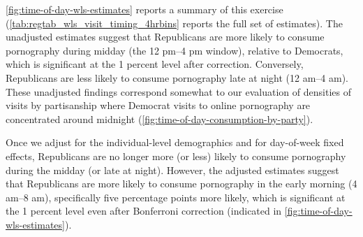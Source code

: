 \documentclass[12pt,twoside]{article}
\begin{document}
\cref{fig:time-of-day-wls-estimates} reports a summary of this exercise (\cref{tab:regtab_wls_visit_timing_4hrbins} reports the full set of estimates). The unadjusted estimates suggest that Republicans are more likely to consume pornography during midday (the 12 pm--4 pm window), relative to Democrats, which is significant at the 1 percent level after correction. Conversely, Republicans are less likely to consume pornography late at night (12 am--4 am). These unadjusted findings correspond somewhat to our evaluation of densities of visits by partisanship where Democrat visits to online pornography are concentrated around midnight (\cref{fig:time-of-day-consumption-by-party}).

Once we adjust for the individual-level demographics and for day-of-week fixed effects, Republicans are no longer more (or less) likely to consume pornography during the midday (or late at night). However, the adjusted estimates suggest that Republicans are more likely to consume pornography in the early morning (4 am--8 am), specifically five percentage points more likely, which is significant at the 1 percent level even after Bonferroni correction (indicated in \cref{fig:time-of-day-wls-estimates}).
\end{document}

